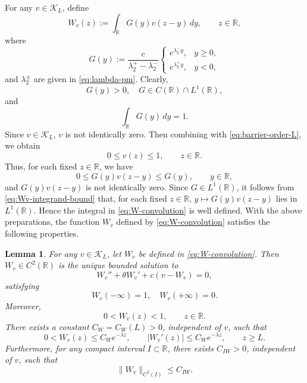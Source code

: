 \documentclass[preprint,sort&compress,final,12pt]{elsarticle}
\newtheorem{lemma}[theorem]{Lemma}
\numberwithin{equation}{section}
\begin{document}
For any $v\in\mathcal K_L$, define
\begin{equation}\label{eq:W-convolution}
W_v(z):=\int_{\mathbb R}G(y)v(z-y)\,dy,\qquad z\in\mathbb R,
\end{equation}
where
\begin{equation*}
G(y):=
\frac{c}{\lambda_2^+-\lambda_2^-}
\begin{cases}
e^{\lambda_2^-y}, & y\geqslant0,\\[0.2cm]
e^{\lambda_2^+y}, & y<0,
\end{cases}
\end{equation*}
and $\lambda_2^\pm$ are given in \eqref{eq:lambda-pm}. Clearly,
\begin{equation*}
G(y)>0,\quad G\in C(\mathbb R)\cap L^1(\mathbb R),
\end{equation*}
and
\begin{equation}\label{eq:G-mass-one}
\int_{\mathbb R}G(y)\,dy=1.
\end{equation}
Since $v\in\mathcal K_L$, $v$ is not identically zero. Then combining with \eqref{eq:barrier-order-L}, we obtain
\begin{equation*}
0\le v(z)\le1,\qquad z\in\mathbb R.
\end{equation*}
Thus, for each fixed $z\in\mathbb R$, we have
\begin{equation}\label{eq:Wv-integrand-bound}
0\le G(y)v(z-y)\le G(y),\qquad y\in\mathbb R,
\end{equation}
and $G(y)v(z-y)$ is not identically zero. Since $G\in L^1(\mathbb R)$, it follows from \eqref{eq:Wv-integrand-bound} that, for each fixed $z\in\mathbb R$, $y\mapsto G(y)v(z-y)$ lies in $L^1(\mathbb R)$. Hence the integral in \eqref{eq:W-convolution} is well defined. With the above preparations, the  function $W_v$ defined by \eqref{eq:W-convolution} satisfies the following properties.
\begin{lemma}\label{lem:Wv-representation}
For any $v\in\mathcal K_L$, let $W_v$ be defined in \eqref{eq:W-convolution}. Then $W_v\in C^2(\mathbb R)$ is the unique bounded solution to
\begin{equation}\label{eq:W-equation}
W_v''+\theta W_v'+c(v-W_v)=0,
\end{equation}
satisfying
\begin{equation}\label{eq:W-basic-ends}
W_v(-\infty)=1,\quad W_v(+\infty)=0.
\end{equation}
Moreover,
\begin{equation*}
0<W_v(z)<1,\qquad z\in\mathbb R.
\end{equation*}
There exists a constant $C_W=C_W(L)>0$, independent of $v$, such that
\begin{equation}\label{eq:W-tail}
0<W_v(z)\le C_We^{-\lambda z},\qquad|W_v'(z)|\le C_We^{-\lambda z},\qquad z\ge L.
\end{equation}
Furthermore, for any compact interval $I\subset\mathbb R$, there exists $C_{IW}>0$, independent of $v$, such that
\begin{equation*}
\|W_v\|_{C^2(I)}\le C_{IW}.
\end{equation*}
\end{lemma}
\end{document}
